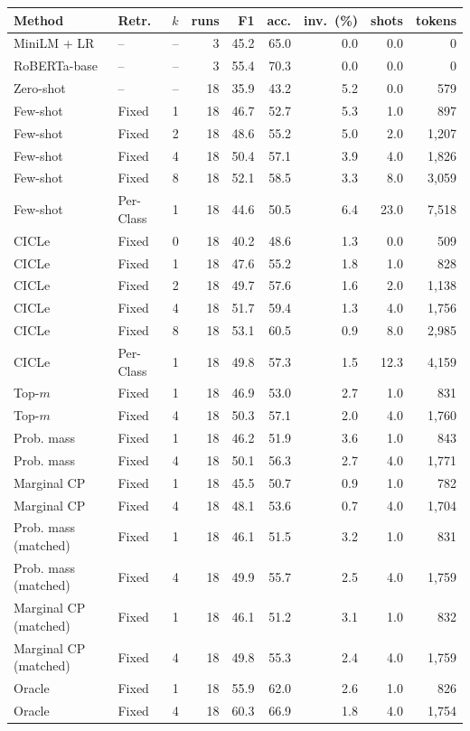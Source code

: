 \begin{tabular}{llrrrrrrr}
\toprule
Method & Retr. & $k$ & runs & F1 & acc. & inv.\ (\%) & shots & tokens \\
\midrule
MiniLM + LR & -- & -- & 3 & 45.2 & 65.0 & 0.0 & 0.0 & 0 \\
RoBERTa-base & -- & -- & 3 & 55.4 & 70.3 & 0.0 & 0.0 & 0 \\
\midrule
Zero-shot & -- & -- & 18 & 35.9 & 43.2 & 5.2 & 0.0 & 579 \\
\midrule
Few-shot & Fixed & 1 & 18 & 46.7 & 52.7 & 5.3 & 1.0 & 897 \\
Few-shot & Fixed & 2 & 18 & 48.6 & 55.2 & 5.0 & 2.0 & 1,207 \\
Few-shot & Fixed & 4 & 18 & 50.4 & 57.1 & 3.9 & 4.0 & 1,826 \\
Few-shot & Fixed & 8 & 18 & 52.1 & 58.5 & 3.3 & 8.0 & 3,059 \\
Few-shot & Per-Class & 1 & 18 & 44.6 & 50.5 & 6.4 & 23.0 & 7,518 \\
CICLe & Fixed & 0 & 18 & 40.2 & 48.6 & 1.3 & 0.0 & 509 \\
CICLe & Fixed & 1 & 18 & 47.6 & 55.2 & 1.8 & 1.0 & 828 \\
CICLe & Fixed & 2 & 18 & 49.7 & 57.6 & 1.6 & 2.0 & 1,138 \\
CICLe & Fixed & 4 & 18 & 51.7 & 59.4 & 1.3 & 4.0 & 1,756 \\
CICLe & Fixed & 8 & 18 & 53.1 & 60.5 & 0.9 & 8.0 & 2,985 \\
CICLe & Per-Class & 1 & 18 & 49.8 & 57.3 & 1.5 & 12.3 & 4,159 \\
\midrule
Top-$m$ & Fixed & 1 & 18 & 46.9 & 53.0 & 2.7 & 1.0 & 831 \\
Top-$m$ & Fixed & 4 & 18 & 50.3 & 57.1 & 2.0 & 4.0 & 1,760 \\
Prob. mass & Fixed & 1 & 18 & 46.2 & 51.9 & 3.6 & 1.0 & 843 \\
Prob. mass & Fixed & 4 & 18 & 50.1 & 56.3 & 2.7 & 4.0 & 1,771 \\
Marginal CP & Fixed & 1 & 18 & 45.5 & 50.7 & 0.9 & 1.0 & 782 \\
Marginal CP & Fixed & 4 & 18 & 48.1 & 53.6 & 0.7 & 4.0 & 1,704 \\
Prob. mass (matched) & Fixed & 1 & 18 & 46.1 & 51.5 & 3.2 & 1.0 & 831 \\
Prob. mass (matched) & Fixed & 4 & 18 & 49.9 & 55.7 & 2.5 & 4.0 & 1,759 \\
Marginal CP (matched) & Fixed & 1 & 18 & 46.1 & 51.2 & 3.1 & 1.0 & 832 \\
Marginal CP (matched) & Fixed & 4 & 18 & 49.8 & 55.3 & 2.4 & 4.0 & 1,759 \\
Oracle & Fixed & 1 & 18 & 55.9 & 62.0 & 2.6 & 1.0 & 826 \\
Oracle & Fixed & 4 & 18 & 60.3 & 66.9 & 1.8 & 4.0 & 1,754 \\
\bottomrule
\end{tabular}
